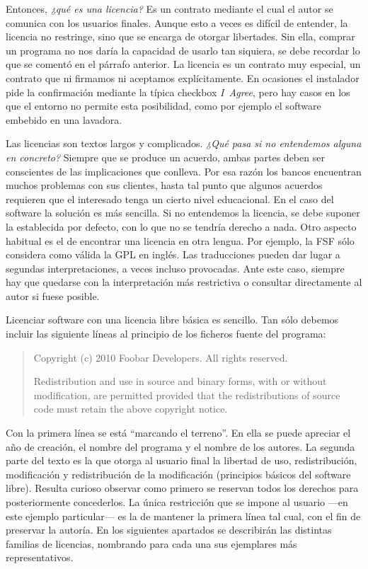 Entonces, \emph{¿qué es una licencia?} Es un contrato mediante el cual
el autor se comunica con los usuarios finales. Aunque esto a veces es
difícil de entender, la licencia no restringe, sino que se encarga de
otorgar libertades. Sin ella, comprar un programa no nos daría la
capacidad de usarlo tan siquiera, se debe recordar lo que se comentó
en el párrafo anterior. La licencia es un contrato muy especial, un
contrato que ni firmamos ni aceptamos explícitamente. En ocasiones el
instalador pide la confirmación mediante la típica checkbox
\emph{I~Agree}, pero hay casos en los que el entorno no permite esta
posibilidad, como por ejemplo el software embebido en una lavadora.

Las licencias son textos largos y complicados. \emph{¿Qué pasa si no
  entendemos alguna en concreto?} Siempre que se produce un acuerdo,
ambas partes deben ser conscientes de las implicaciones que
conlleva. Por esa razón los bancos encuentran muchos problemas con sus
clientes, hasta tal punto que algunos acuerdos requieren que el
interesado tenga un cierto nivel educacional. En el caso del software
la solución es más sencilla. Si no entendemos la licencia, se debe
suponer la establecida por defecto, con lo que no se tendría derecho a
nada. Otro aspecto habitual es el de encontrar una licencia en otra
lengua. Por ejemplo, la FSF sólo considera como válida la GPL en
inglés. Las traducciones pueden dar lugar a segundas interpretaciones,
a veces incluso provocadas. Ante este caso, siempre hay que quedarse
con la interpretación más restrictiva o consultar directamente al
autor si fuese posible.

Licenciar software con una licencia libre básica es sencillo. Tan sólo
debemos incluir las siguiente líneas al principio de los ficheros
fuente del programa:
\begin{quotation}
Copyright (c) 2010 Foobar Developers. All rights reserved.

Redistribution and use in source and binary forms, with or without
modification, are permitted provided that the redistributions of
source code must retain the above copyright notice.
\end{quotation}
Con la primera línea se está ``marcando el terreno''. En ella se puede
apreciar el año de creación, el nombre del programa y el nombre de los
autores. La segunda parte del texto es la que otorga al usuario final
la libertad de uso, redistribución, modificación y redistribución de
la modificación (principios básicos del software libre). Resulta
curioso observar como primero se reservan todos los derechos para
posteriormente concederlos. La única restricción que se impone al
usuario ---en este ejemplo particular--- es la de mantener la primera
línea tal cual, con el fin de preservar la autoría. En los siguientes
apartados se describirán las distintas familias de licencias,
nombrando para cada una sus ejemplares más representativos.

